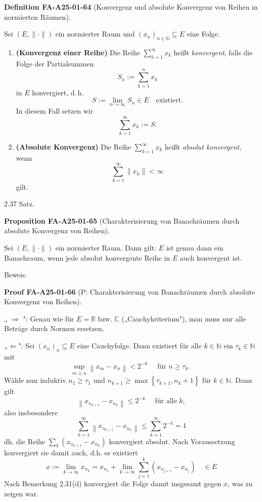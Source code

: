 \documentclass[10pt, letterpaper]{article}
\newcommand{\CustomHeading}[3]{%
  \par\medskip\noindent%
  \textbf{#1 #2} \textnormal{(#3)}.\enskip%
}
\newenvironment{DEF}[2]{\begin{unitbox}\CustomHeading{Definition}{#1}{#2}}{\end{unitbox}}
\newenvironment{PROP}[2]{\begin{unitbox}\CustomHeading{Proposition}{#1}{#2}}{\end{unitbox}}
\newenvironment{PROOF}[2]{\begin{unitbox}\CustomHeading{Proof}{#1}{#2}}{\end{unitbox}}
\begin{document}
\begin{DEF}{FA-A25-01-64}{Konvergenz und absolute Konvergenz von Reihen in normierten Räumen}
Sei $(E,\|\cdot\|)$ ein normierter Raum und $(x_n)_{n\in\mathbb{N}}\subseteq E$ eine Folge.

\begin{enumerate}
\item[(a)] \textbf{(Konvergenz einer Reihe)}  
Die Reihe $\sum_{k=1}^{\infty} x_k$ heißt \emph{konvergent}, falls die Folge der Partialsummen
\[
S_n := \sum_{k=1}^{n} x_k
\]
in $E$ konvergiert, d.\,h.
\[
S := \lim_{n\to\infty} S_n \in E \quad \text{existiert}.
\]
In diesem Fall setzen wir
\[
\sum_{k=1}^{\infty} x_k := S.
\]

\item[(b)] \textbf{(Absolute Konvergenz)}  
Die Reihe $\sum_{k=1}^{\infty} x_k$ heißt \emph{absolut konvergent}, wenn
\[
\sum_{k=1}^{\infty} \|x_k\| < \infty
\]
gilt.
\end{enumerate}
\end{DEF}



2.37 Satz. 

\begin{PROP}{FA-A25-01-65}{Charakterisierung von Banachräumen durch absolute Konvergenz von Reihen}
Sei $(E,\|\cdot\|)$ ein normierter Raum. Dann gilt: $E$ ist genau dann ein Banachraum, wenn jede absolut konvergente Reihe in $E$ auch konvergent ist.
\end{PROP}


Beweis. 

\begin{PROOF}{FA-A25-01-66}{P: Charakterisierung von Banachräumen durch absolute Konvergenz von Reihen}
„ $\Longrightarrow$ ": Genau wie für $E=\mathbb{R}$ bzw. $\mathbb{C}$ („Cauchykriterium"), man muss nur alle Beträge durch Normen ersetzen.

„$\Longleftarrow$": Sei $\left(x_{n}\right)_{n} \subseteq E$ eine Cauchyfolge. Dann existiert für alle $k \in \mathbb{N}$ ein $\tau_{k} \in \mathbb{N}$ mit
$$
\sup _{m \geq n}\left\|x_{m}-x_{n}\right\|<2^{-k} \quad \text { für } n \geq \tau_{k} \text {. }
$$
Wähle nun induktiv $n_{1} \geq \tau_{1}$ und $n_{k+1} \geq \max \left\{\tau_{k+1}, n_{k}+1\right\}$ für $k \in \mathbb{N}$. Dann gilt
$$
\left\|x_{n_{k+1}}-x_{n_{k}}\right\| \leq 2^{-k} \quad \text { für alle } k,
$$
also insbesondere
$$
\sum_{k=1}^{\infty}\left\|x_{n_{k+1}}-x_{n_{k}}\right\| \leq \sum_{k=1}^{\infty} 2^{-k}=1
$$
dh. die Reihe $\sum_{k}\left(x_{n_{k+1}}-x_{n_{k}}\right)$ konvergiert absolut. Nach Voraussetzung konvergiert sie damit auch, d.h. es existiert
$$
x:=\lim _{k \rightarrow \infty} x_{n_{k}}=x_{n_{1}}+\lim _{k \rightarrow \infty} \sum_{j=1}^{k}\left(x_{n_{j+1}}-x_{n_{j}}\right) \quad \in E
$$
Nach Bemerkung 2.31(d) konvergiert die Folge damit insgesamt gegen $x$, was zu zeigen war.
\end{PROOF}
\end{document}
